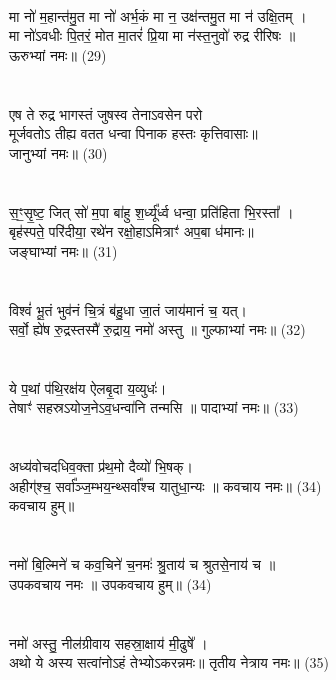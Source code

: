 \\
मा नो॑ म॒हान्त॑मु॒त मा नो॑ अर्भ॒कं मा न॒ उक्ष॑न्तमु॒त मा न॑ उक्षि॒तम् ।\\
मा नो॑ऽवधीः पि॒तरं॒ मोत मा॒तरं॑ प्रि॒या मा न॑स्त॒नुवो॑ रुद्र रीरिषः ॥\\
ऊरुभ्यां नमः॥ (29)\\
{\small{}}\\
\\
एष ते रुद्र भागस्तं जुषस्व तेनाऽवसेन परो \\
मूर्जवतोऽ तीह्य वतत धन्वा पिनाक हस्तः कृत्तिवासाः॥ \\
जानुभ्यां नमः॥ (30)\\
{\small{}}\\
\\
स॒ꣳ॒सृ॒ष्ट॒ जित् सो॑ म॒पा बा॑हु श॒र्ध्यू᳚र्ध्व धन्वा॒ प्रति॑हिता भि॒रस्ता᳚ ।\\
बृह॑स्पते॒ परि॑दीया॒ रथे॑न रक्षो॒हाऽमित्राꣳ॑ अप॒बा ध॑मानः॥ \\
जङ्घाभ्यां नमः॥ (31)\\
{\small{}}\\
\\
विश्वं॑ भू॒तं भुव॑नं चि॒त्रं ब॑हु॒धा जा॒तं जाय॑मानं च॒ यत्।\\
सर्वो॒ ह्ये॑ष रु॒द्रस्तस्मै॑ रु॒द्राय॒ नमो॑ अस्तु ॥ गुल्फाभ्यां नमः॥ (32)\\
{\small{}}\\
\\
ये प॒थां प॑थि॒रक्ष॑य ऐलबृ॒दा य॒व्युधः॑।\\
तेषाꣳ॑ सहस्रऽयोज॒नेऽव॒धन्वा॑नि तन्मसि ॥ पादाभ्यां नमः॥ (33)\\
{\small{}}\\
\\
अध्य॑वोचदधिव॒क्ता प्र॑थ॒मो दैव्यो॑ भि॒षक्।\\
अहीग्॑श्च॒ सर्वा᳚ञ्ज॒म्भय॒न्थ्सर्वा᳚श्च यातुधा॒न्यः ॥ कवचाय नमः॥ (34)\\
{\small  कवचाय हुम्॥}\\
{\small{}}\\
\\
नमो॑ बि॒ल्मिने॑ च कव॒चिने॑ च॒नमः॑ श्रु॒ताय॑ च श्रुतसे॒नाय॑ च ॥ \\
उपकवचाय नमः ॥ {\small उपकवचाय हुम्॥ } (34)\\
{\small{}}\\
\\
नमो॑ अस्तु॒ नील॑ग्रीवाय सहस्रा॒क्षाय॑ मी॒ढुषे᳚ ।\\
अथो ये अस्य सत्वांनोऽहं तेभ्योऽकरन्नमः॥ तृतीय नेत्राय नमः॥ (35)\\
